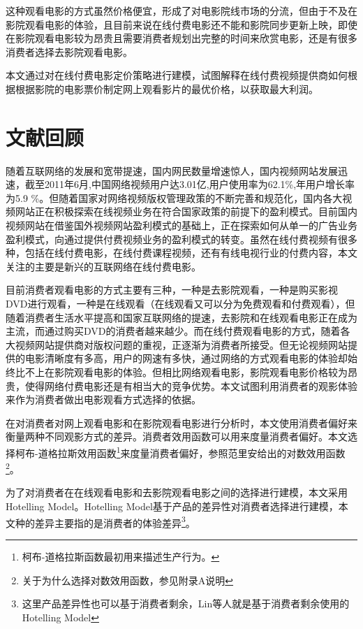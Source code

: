 \documentclass[paper=a4, fontsize=10.5pt]{scrartcl} %
\numberwithin{equation}{section} %
\numberwithin{figure}{section} %
\numberwithin{table}{section} %
\begin{document}
\begin{CJK}{UTF8}{gbsn}
这种观看电影的方式虽然价格便宜，形成了对电影院线市场的分流，但由于不及在影院观看电影的体验，且目前来说在线付费电影还不能和影院同步更新上映，即使在影院观看电影较为昂贵且需要消费者规划出完整的时间来欣赏电影，还是有很多消费者选择去影院观看电影。

本文通过对在线付费电影定价策略进行建模，试图解释在线付费视频提供商如何根据根据影院的电影票价制定网上观看影片的最优价格，以获取最大利润。

\section{文献回顾}
随着互联网络的发展和宽带提速，国内网民数量增速惊人，国内视频网站发展迅速，截至2011年6月,中国网络视频用户达3.01亿,用户使用率为62.1\%,年用户增长率为5.9 \%\cite{GaoHui2012}。但随着国家对网络视频版权管理政策的不断完善和规范化，国内各大视频网站正在积极探索在线视频业务在符合国家政策的前提下的盈利模式。目前国内视频网站在借鉴国外视频网站盈利模式的基础上，正在探索如何从单一的广告业务盈利模式，向通过提供付费视频业务的盈利模式的转变\cite{GuoTie2011netflix}。虽然在线付费视频有很多种，包括在线付费电影，在线付费课程视频，还有有线电视行业的付费内容，本文关注的主要是新兴的互联网络在线付费电影。

目前消费者观看电影的方式主要有三种，一种是去影院观看，一种是购买影视DVD进行观看，一种是在线观看（在线观看又可以分为免费观看和付费观看），但随着消费者生活水平提高和国家互联网络的提速，去影院和在线观看电影正在成为主流，而通过购买DVD的消费者越来越少。而在线付费观看电影的方式，随着各大视频网站提供商对版权问题的重视，正逐渐为消费者所接受。但无论视频网站提供的电影清晰度有多高，用户的网速有多快，通过网络的方式观看电影的体验却始终比不上在影院观看电影的体验。但相比网络观看电影，影院观看电影价格较为昂贵，使得网络付费电影还是有相当大的竞争优势。本文试图利用消费者的观影体验来作为消费者做出电影观看方式选择的依据。

在对消费者对网上观看电影和在影院观看电影进行分析时，本文使用消费者偏好来衡量两种不同观影方式的差异。消费者效用函数可以用来度量消费者偏好。本文选择柯布-道格拉斯效用函数\footnote{柯布-道格拉斯函数最初用来描述生产行为。}来度量消费者偏好，参照范里安给出的对数效用函数\footnote{关于为什么选择对数效用函数，参见附录A说明}\cite{Varian2007}。

为了对消费者在在线观看电影和去影院观看电影之间的选择进行建模，本文采用Hotelling Model。Hotelling Model基于产品的差异性对消费者选择进行建模，本文种的差异主要指的是消费者的体验差异\footnote{这里产品差异性也可以基于消费者剩余，Lin等人就是基于消费者剩余使用的Hotelling Model\cite{LinHao2014}}。


\end{CJK}
\end{document}
